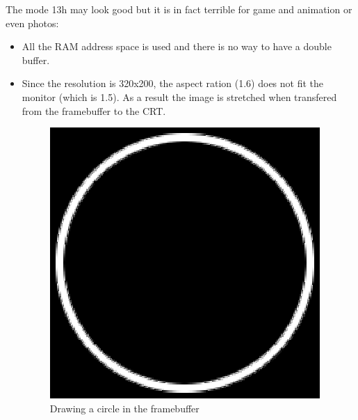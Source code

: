 \documentclass[book.tex]{subfiles}
\begin{document}
  The mode 13h may look good but it is in fact terrible for game and animation or even photos:\\
  \begin{itemize}
\item All the RAM address space is used and there is no way to have a double buffer.
\item Since the resolution is 320x200, the aspect ration (1.6) does not fit the monitor (which is 1.5). As a result the image is stretched when transfered from the 
framebuffer to the CRT.

 \begin{figure}[H]
\centering
\includegraphics[width=\textwidth]{imgs/circleframebuffer.eps}
%
\caption{Drawing a circle in the framebuffer}
\end{figure}


\end{itemize}
\end{document}
